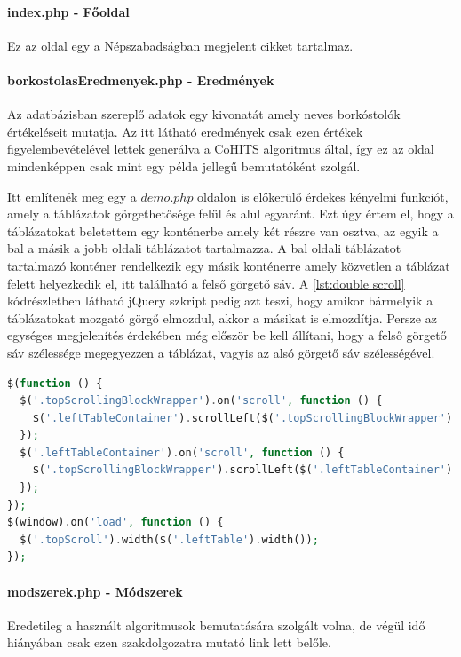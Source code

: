 \documentclass[12pt]{report}
\theoremstyle{definition}
\begin{document}
	\paragraph{index.php - Főoldal} Ez az oldal egy a Népszabadságban megjelent cikket tartalmaz.
	\paragraph{borkostolasEredmenyek.php - Eredmények} Az adatbázisban szereplő adatok egy kivonatát amely neves borkóstolók értékeléseit mutatja. Az itt látható eredmények csak ezen értékek figyelembevételével lettek generálva a CoHITS algoritmus által, így ez az oldal mindenképpen csak mint egy példa jellegű bemutatóként szolgál. 
	
	Itt említenék meg egy a $demo.php$ oldalon is előkerülő érdekes kényelmi funkciót, amely a táblázatok görgethetősége felül és alul egyaránt. Ezt úgy értem el, hogy a táblázatokat beletettem egy konténerbe amely két részre van osztva, az egyik a bal a másik a jobb oldali táblázatot tartalmazza. A bal oldali táblázatot tartalmazó konténer rendelkezik egy másik konténerre amely közvetlen a táblázat felett helyezkedik el, itt található a felső görgető sáv. A \ref{lst:double scroll} kódrészletben látható jQuery szkript pedig azt teszi, hogy amikor bármelyik a táblázatokat mozgató görgő elmozdul, akkor a másikat is elmozdítja. Persze az egységes megjelenítés érdekében még először be kell állítani, hogy a felső görgető sáv szélessége megegyezzen a táblázat, vagyis az alsó görgető sáv szélességével.
	
	\noindent\begin{minipage}{\linewidth}
		\begin{lstlisting}[language=php,label={lst:double scroll}, caption={Dupla görgető sáv jQuery -vel}]
$(function () {
  $('.topScrollingBlockWrapper').on('scroll', function () {
    $('.leftTableContainer').scrollLeft($('.topScrollingBlockWrapper').scrollLeft());
  });
  $('.leftTableContainer').on('scroll', function () {
    $('.topScrollingBlockWrapper').scrollLeft($('.leftTableContainer').scrollLeft());
  });
});
$(window).on('load', function () {
  $('.topScroll').width($('.leftTable').width());
});
		\end{lstlisting}
	\end{minipage}
	
	\paragraph{modszerek.php - Módszerek} Eredetileg a használt algoritmusok bemutatására szolgált volna, de végül idő hiányában csak ezen szakdolgozatra mutató link lett belőle.
\end{document}

